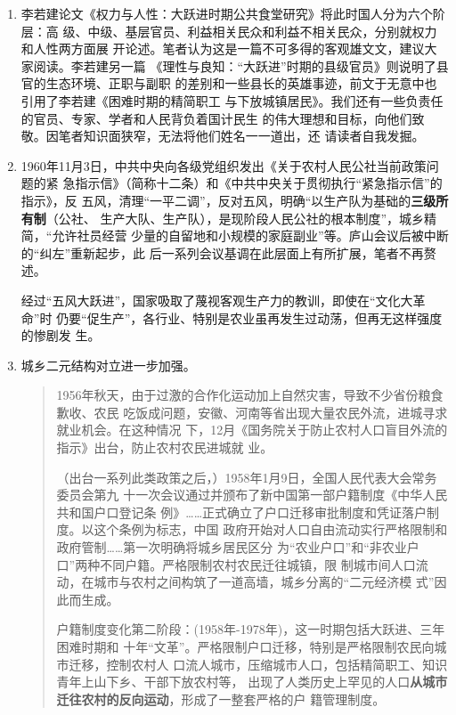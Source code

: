 \begin{enumerate}

\item 李若建论文《权力与人性：大跃进时期公共食堂研究》将此时国人分为六个阶层：高
  级、中级、基层官员、利益相关民众和利益不相关民众，分别就权力和人性两方面展
  开论述。笔者认为这是一篇不可多得的客观雄文文，建议大家阅读。李若建另一篇
  《理性与良知：“大跃进”时期的县级官员》则说明了县官的生态环境、正职与副职
  的差别和一些县长的英雄事迹，前文于无意中也引用了李若建《困难时期的精简职工
  与下放城镇居民》。我们还有一些负责任的官员、专家、学者和人民背负着国计民生
  的伟大理想和目标，向他们致敬。因笔者知识面狭窄，无法将他们姓名一一道出，还
  请读者自我发掘。

\item 1960年11月3日，中共中央向各级党组织发出《关于农村人民公社当前政策问题的紧
  急指示信》（简称十二条）和《中共中央关于贯彻执行“紧急指示信”的指示》，反
  五风，清理“一平二调”，反对五风，明确“以生产队为基础的\textbf{三级所有制}（公社、
  生产大队、生产队），是现阶段人民公社的根本制度”，城乡精简，“允许社员经营
  少量的自留地和小规模的家庭副业”等。庐山会议后被中断的“纠左”重新起步，此
  后一系列会议基调在此层面上有所扩展，笔者不再赘述。%

  经过“五风大跃进”，国家吸取了蔑视客观生产力的教训，即使在“文化大革命”时
  仍要“促生产”，各行业、特别是农业虽再发生过动荡，但再无这样强度的惨剧发
  生。


\item 城乡二元结构对立进一步加强。
  \begin{quotation}
    1956年秋天，由于过激的合作化运动加上自然灾害，导致不少省份粮食歉收、农民
    吃饭成问题，安徽、河南等省出现大量农民外流，进城寻求就业机会。在这种情况
    下，12月《国务院关于防止农村人口盲目外流的指示》出台，防止农村农民进城就
    业。

    （出台一系列此类政策之后，）1958年1月9日，全国人民代表大会常务委员会第九
    十一次会议通过并颁布了新中国第一部户籍制度《中华人民共和国户口登记条
    例》……正式确立了户口迁移审批制度和凭证落户制度。以这个条例为标志，中国
    政府开始对人口自由流动实行严格限制和政府管制……第一次明确将城乡居民区分
    为“农业户口”和“非农业户口”两种不同户籍。严格限制农村农民迁往城镇，限
    制城市间人口流动，在城市与农村之间构筑了一道高墙，城乡分离的“二元经济模
    式”因此而生成。

    户籍制度变化第二阶段：(1958年-1978年)，这一时期包括大跃进、三年困难时期和
    十年“文革”。严格限制户口迁移，特别是严格限制农民向城市迁移，控制农村人
    口流人城市，压缩城市人口，包括精简职工、知识青年上山下乡、干部下放农村等，
    出现了人类历史上罕见的人口\textbf{从城市迁往农村的反向运动}，形成了一整套严格的户
    籍管理制度。\cite{quxiaohuji}
  \end{quotation}


\end{enumerate}
